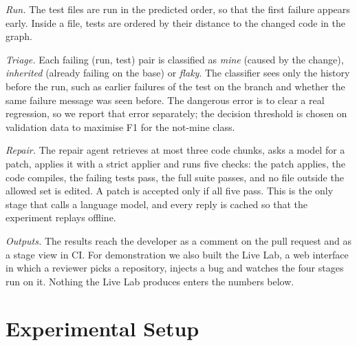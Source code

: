 \documentclass[10pt,conference]{IEEEtran}
\begin{document}
\textit{Run.} The test files are run in the predicted order, so that the first failure appears early. Inside a file, tests are ordered by their distance to the changed code in the graph.

\textit{Triage.} Each failing (run, test) pair is classified as \emph{mine} (caused by the change), \emph{inherited} (already failing on the base) or \emph{flaky}. The classifier sees only the history before the run, such as earlier failures of the test on the branch and whether the same failure message was seen before. The dangerous error is to clear a real regression, so we report that error separately; the decision threshold is chosen on validation data to maximise F1 for the not-mine class.

\textit{Repair.} The repair agent retrieves at most three code chunks, asks a model for a patch, applies it with a strict applier and runs five checks: the patch applies, the code compiles, the failing tests pass, the full suite passes, and no file outside the allowed set is edited. A patch is accepted only if all five pass. This is the only stage that calls a language model, and every reply is cached so that the experiment replays offline.

\textit{Outputs.} The results reach the developer as a comment on the pull request and as a stage view in CI. For demonstration we also built the Live Lab, a web interface in which a reviewer picks a repository, injects a bug and watches the four stages run on it. Nothing the Live Lab produces enters the numbers below.

\section{Experimental Setup}
\label{sec:setup}
\end{document}
